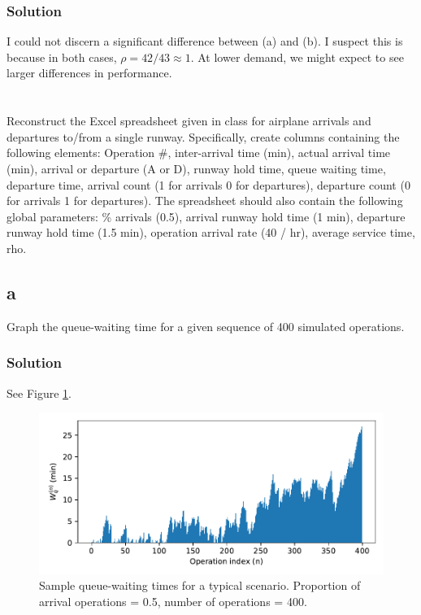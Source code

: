 \documentclass[letterpaper]{amsart}
\begin{document}
\subsubsection*{Solution}
I could not discern a significant difference between (a) and (b). I suspect this
is because in both cases, $\rho=42/43\approx 1$. At lower demand, we might
expect to see larger differences in performance.

\section{} %
Reconstruct the Excel spreadsheet given in class for airplane arrivals
and departures to/from a single runway. Specifically, create columns containing
the following elements: Operation \#, inter-arrival time (min), actual arrival time
(min), arrival or departure (A or D), runway hold time, queue waiting time,
departure time, arrival count (1 for arrivals 0 for departures), departure count (0
for arrivals 1 for departures). The spreadsheet should also contain the following
global parameters: \% arrivals (0.5), arrival runway hold time (1 min), departure
runway hold time (1.5 min), operation arrival rate (40 / hr), average service time,
rho.
\subsection*{a}
Graph the queue-waiting time for a given sequence of 400 simulated
operations.
\subsubsection*{Solution}
See Figure \ref{fig:5a}.
\begin{figure}
  \centering
  \caption{Sample queue-waiting times for a typical scenario.
    Proportion of arrival operations = 0.5, number of operations = 400.}
  \label{fig:5a}
  \includegraphics[width=\textwidth]{path}
\end{figure}
\end{document}
